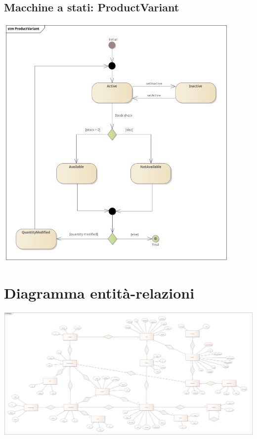 \subsection{Macchine a stati: ProductVariant}
\begin{center}
  \includegraphics[width=0.9\textwidth]{immagini/Progettazione/MachineStateDiagrams/ProductVariant.png}
\end{center}

\section{Diagramma entità-relazioni}
\begin{center}
  \includegraphics[width=1\textwidth]{immagini/Progettazione/ERDiagram.png}
\end{center}



